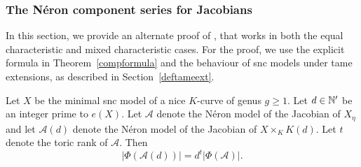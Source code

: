 \subsubsection{The N\'{e}ron component series for Jacobians}\label{altprfcomp}
In this section, we provide an alternate proof of \cite[Chapter~3, Proposition~3.1.1]{halnic}, that works in both the equal characteristic and mixed characteristic cases. For the proof, we use the explicit formula in Theorem~\ref{compformula} and the behaviour of {\textup{snc}} models under tame extensions, as described in Section~\ref{deftameext}.

\begin{prop}\cite[Chapter~3, Proposition~3.1.1]{halnic}\label{newproof}
 Let $X$ be the minimal {\textup{snc}} model of a nice $K$-curve of genus $g \geq 1$. Let $d \in \mathbb N'$ be an integer prime to $e(X)$. Let $\mathcal{A}$ denote the N\'{e}ron model of the Jacobian of $X_\eta$ and let $\mathcal{A}(d)$ denote the N\'{e}ron model of the Jacobian of $X \times_K K(d)$. Let $t$ denote the toric rank of $\mathcal{A}$. Then
 \[ |\Phi(\mathcal{A}(d))| = d^t |\Phi(\mathcal{A})| .\]
\end{prop}

